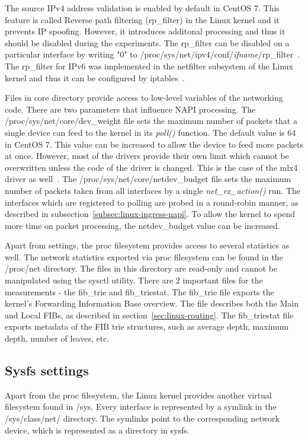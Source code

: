 The source IPv4 address validation is enabled by default in CentOS 7.
This feature is called Reverse path filtering (rp\_filter) in the Linux kernel and it prevents IP spoofing.
However, it introduces additonal processing and thus it should be disabled during the experiments.
The rp\_filter can be disabled on a particular interface
by writing "0" to /proc/sys/net/ipv4/conf/{\it{ifname}}/rp\_filter~\cite{kernel-doc-ip-sysctl}.
The rp\_filter for IPv6 was implemented in the netfilter subsystem of the Linux kernel and
thus it can be configured by iptables~\cite{kernel-source}.

Files in core directory provide access to low-level variables of the networking code.
There are two parameters that influence NAPI processing.
The /proc/sys/net/core/dev\_weight file sets the maximum number of packets that a single device
can feed to the kernel in its {\it{poll()}} function.
The default value is 64 in CentOS 7.
This value can be increased to allow the device to feed more packets at once.
However, most of the drivers provide their own limit which cannot be overwritten unless the code of the driver is changed.
This is the case of the mlx4 driver as well~\cite{kernel-source}.
The /proc/sys/net/core/netdev\_budget file sets the
maximum number of packets taken from all interfaces by a single {\it{net\_rx\_action()}} run.
The interfaces which are registered to polling are
probed in a round-robin manner, as described in subsection~\ref{subsec:linux-ingress-napi}.
To allow the kernel to spend more time on packet processing, the netdev\_budget value can be increased.

Apart from settings, the proc filesystem provides access to several statistics as well.
The network statistics exported via proc filesystem can be found in the /proc/net directory.
The files in this directory are read-only and cannot be manipulated using the sysctl utility.
There are 2 important files for the measurements - the fib\_trie and fib\_triestat.
The fib\_trie file exports the kernel's Forwarding Information Base overview.
The file describes both the Main and Local FIBs, as described in section~\ref{sec:linux-routing}.
The fib\_triestat file exports metadata of the FIB trie structures,
such as average depth, maximum depth, number of leaves, etc.

\subsection{Sysfs settings}
Apart from the proc filesystem, the Linux kernel provides another virtual filesystem found in /sys.
Every interface is represented by a symlink in the /sys/class/net/ directory.
The symlinks point to the corresponding network device, which is represented as a directory in sysfs.


